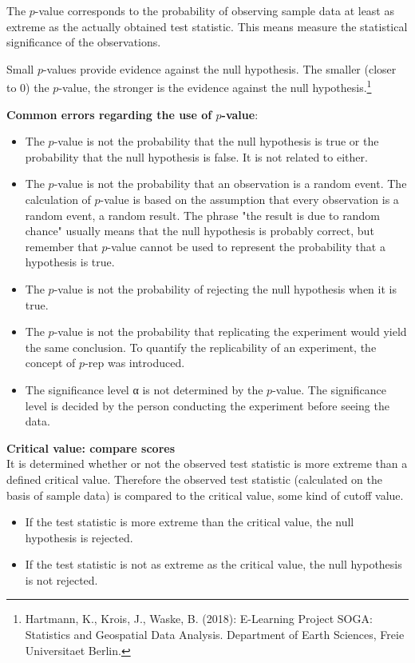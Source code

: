 \documentclass{article}
\begin{document}
The $p$-value corresponds to the probability of observing sample data at least as extreme as the actually obtained test statistic. This means measure the statistical significance of the observations. 

Small $p$-values provide evidence against the null hypothesis. The smaller (closer to 0) the $p$-value, the stronger is the evidence against the null hypothesis.\footnote{Hartmann, K., Krois, J., Waske, B. (2018): E-Learning Project SOGA: Statistics and Geospatial Data Analysis. Department of Earth Sciences, Freie Universitaet Berlin.}

\textbf{Common errors regarding the use of $p$-value}:
\begin{itemize}
    \item The $p$-value is not the probability that the null hypothesis is true or the probability that the null hypothesis is false. It is not related to either.
    \item The $p$-value is not the probability that an observation is a random event. The calculation of $p$-value is based on the assumption that every observation is a random event, a random result. The phrase "the result is due to random chance" usually means that the null hypothesis is probably correct, but remember that $p$-value cannot be used to represent the probability that a hypothesis is true.
    \item The $p$-value is not the probability of rejecting the null hypothesis when it is true.
    \item The $p$-value is not the probability that replicating the experiment would yield the same conclusion. To quantify the replicability of an experiment, the concept of $p$-rep was introduced.
    \item The significance level α is not determined by the $p$-value. The significance level is decided by the person conducting the experiment before seeing the data.
\end{itemize}

\textbf{Critical value: compare scores}\\
It is determined whether or not the observed test statistic is more extreme than a defined critical value. Therefore the observed test statistic (calculated on the basis of sample data) is compared to the critical value, some kind of cutoff value.
\begin{itemize}
    \item If the test statistic is more extreme than the critical value, the null hypothesis is rejected. 
    \item If the test statistic is not as extreme as the critical value, the null hypothesis is not rejected.
\end{itemize}
\end{document}
